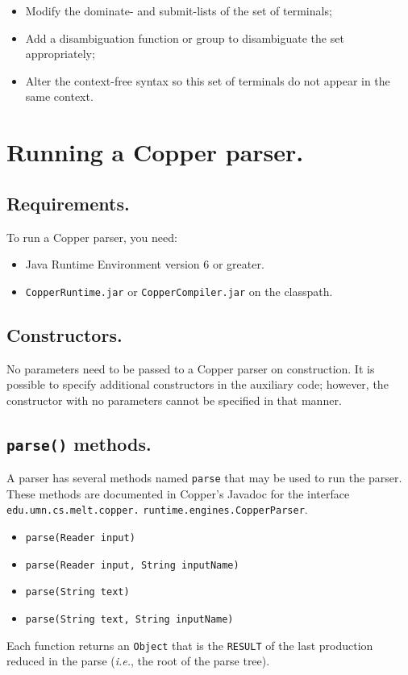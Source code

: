 \documentclass[12pt,english,twoside]{report}
\begin{document}
\begin{itemize}
\item Modify the dominate- and submit-lists of the set of terminals;
\item Add a disambiguation function or group to disambiguate the set appropriately;
\item Alter the context-free syntax so this set of terminals do not appear
in the same context.
\end{itemize}

\chapter{\label{cha:Running-a-Copper-parser.}Running a Copper parser.}

\section{Requirements.}

To run a Copper parser, you need:

\begin{itemize}
\item Java Runtime Environment version 6 or greater.
\item \texttt{CopperRuntime.jar} or \texttt{CopperCompiler.jar} on the classpath.
\end{itemize}

\section{Constructors.}

No parameters need to be passed to a Copper parser on construction.
It is possible to specify additional constructors in the auxiliary
code; however, the constructor with no parameters cannot be specified
in that manner.

\section{\texttt{parse()} methods.}

A parser has several methods named \texttt{parse} that may be used to
run the parser. These methods are documented in Copper's Javadoc for
the interface
\texttt{edu.}\texttt{umn.}\texttt{cs.}\texttt{melt.}\texttt{copper.} \texttt{runtime.}\texttt{engines.}\texttt{CopperParser}.

\begin{itemize}
\item \texttt{parse(Reader input)}
\item \texttt{parse(Reader input, String inputName)}
\item \texttt{parse(String text)}
\item \texttt{parse(String text, String inputName)}
\end{itemize}
Each function returns an \texttt{Object} that is the \texttt{RESULT}
of the last production reduced in the parse (\emph{i.e.}, the root
of the parse tree).
\end{document}
